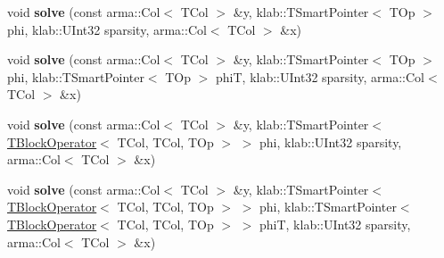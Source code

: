 \begin{DoxyCompactItemize}
\item 
void {\bfseries solve} (const arma\+::\+Col$<$ T\+Col $>$ \&y, klab\+::\+T\+Smart\+Pointer$<$ T\+Op $>$ phi, klab\+::\+U\+Int32 sparsity, arma\+::\+Col$<$ T\+Col $>$ \&x)\hypertarget{classkl1p_1_1TEMBPSolver_af62313de80c147133450a29b1f84d548}{}\label{classkl1p_1_1TEMBPSolver_af62313de80c147133450a29b1f84d548}

\item 
void {\bfseries solve} (const arma\+::\+Col$<$ T\+Col $>$ \&y, klab\+::\+T\+Smart\+Pointer$<$ T\+Op $>$ phi, klab\+::\+T\+Smart\+Pointer$<$ T\+Op $>$ phiT, klab\+::\+U\+Int32 sparsity, arma\+::\+Col$<$ T\+Col $>$ \&x)\hypertarget{classkl1p_1_1TEMBPSolver_a5917cc22bb0d363f8a74746c2914f1a5}{}\label{classkl1p_1_1TEMBPSolver_a5917cc22bb0d363f8a74746c2914f1a5}

\item 
void {\bfseries solve} (const arma\+::\+Col$<$ T\+Col $>$ \&y, klab\+::\+T\+Smart\+Pointer$<$ \hyperlink{classkl1p_1_1TBlockOperator}{T\+Block\+Operator}$<$ T\+Col, T\+Col, T\+Op $>$ $>$ phi, klab\+::\+U\+Int32 sparsity, arma\+::\+Col$<$ T\+Col $>$ \&x)\hypertarget{classkl1p_1_1TEMBPSolver_ad459dd049e4673686094fd3f0adff719}{}\label{classkl1p_1_1TEMBPSolver_ad459dd049e4673686094fd3f0adff719}

\item 
void {\bfseries solve} (const arma\+::\+Col$<$ T\+Col $>$ \&y, klab\+::\+T\+Smart\+Pointer$<$ \hyperlink{classkl1p_1_1TBlockOperator}{T\+Block\+Operator}$<$ T\+Col, T\+Col, T\+Op $>$ $>$ phi, klab\+::\+T\+Smart\+Pointer$<$ \hyperlink{classkl1p_1_1TBlockOperator}{T\+Block\+Operator}$<$ T\+Col, T\+Col, T\+Op $>$ $>$ phiT, klab\+::\+U\+Int32 sparsity, arma\+::\+Col$<$ T\+Col $>$ \&x)\hypertarget{classkl1p_1_1TEMBPSolver_a126d313f3a018fbcd3e8ce4dd449eb89}{}\label{classkl1p_1_1TEMBPSolver_a126d313f3a018fbcd3e8ce4dd449eb89}

\end{DoxyCompactItemize}
